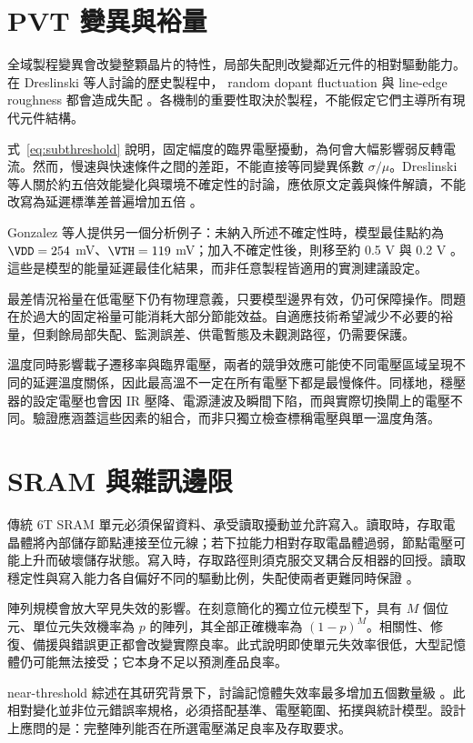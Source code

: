 \section{PVT 變異與裕量}
全域製程變異會改變整顆晶片的特性，局部失配則改變鄰近元件的相對驅動能力。在 Dreslinski 等人討論的歷史製程中， random dopant fluctuation 與 line-edge roughness 都會造成失配 \cite{dreslinski2010}。各機制的重要性取決於製程，不能假定它們主導所有現代元件結構。

式~\eqref{eq:subthreshold} 說明，固定幅度的臨界電壓擾動，為何會大幅影響弱反轉電流。然而，慢速與快速條件之間的差距，不能直接等同變異係數 $\sigma/\mu$。Dreslinski 等人關於約五倍效能變化與環境不確定性的討論，應依原文定義與條件解讀，不能改寫為延遲標準差普遍增加五倍 \cite[Sec.~IV-B]{dreslinski2010}。

Gonzalez 等人提供另一個分析例子：未納入所述不確定性時，模型最佳點約為 $\VDD=254$ mV、$\VTH=119$ mV；加入不確定性後，則移至約 0.5 V 與 0.2 V \cite[Figs.~3 and 6]{gonzalez1997}。這些是模型的能量延遲最佳化結果，而非任意製程皆適用的實測建議設定。

最差情況裕量在低電壓下仍有物理意義，只要模型邊界有效，仍可保障操作。問題在於過大的固定裕量可能消耗大部分節能效益。自適應技術希望減少不必要的裕量，但剩餘局部失配、監測誤差、供電暫態及未觀測路徑，仍需要保護。

溫度同時影響載子遷移率與臨界電壓，兩者的競爭效應可能使不同電壓區域呈現不同的延遲溫度關係，因此最高溫不一定在所有電壓下都是最慢條件。同樣地，穩壓器的設定電壓也會因 IR 壓降、電源漣波及瞬間下陷，而與實際切換閘上的電壓不同。驗證應涵蓋這些因素的組合，而非只獨立檢查標稱電壓與單一溫度角落。

\section{SRAM 與雜訊邊限}
傳統 6T SRAM 單元必須保留資料、承受讀取擾動並允許寫入。讀取時，存取電晶體將內部儲存節點連接至位元線；若下拉能力相對存取電晶體過弱，節點電壓可能上升而破壞儲存狀態。寫入時，存取路徑則須克服交叉耦合反相器的回授。讀取穩定性與寫入能力各自偏好不同的驅動比例，失配使兩者更難同時保證 \cite{dreslinski2010,udvs2010}。

陣列規模會放大罕見失效的影響。在刻意簡化的獨立位元模型下，具有 $M$ 個位元、單位元失效機率為 $p$ 的陣列，其全部正確機率為 $(1-p)^M$。相關性、修復、備援與錯誤更正都會改變實際良率。此式說明即使單元失效率很低，大型記憶體仍可能無法接受；它本身不足以預測產品良率。

 near-threshold 綜述在其研究背景下，討論記憶體失效率最多增加五個數量級 \cite{dreslinski2010}。此相對變化並非位元錯誤率規格，必須搭配基準、電壓範圍、拓撲與統計模型。設計上應問的是：完整陣列能否在所選電壓滿足良率及存取要求。

